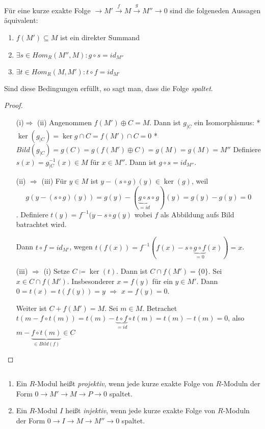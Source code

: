 \documentclass[../main.tex]{subfiles}
\begin{document}
\begin{theorem}%
    Für eine kurze exakte Folge $\rightarrow M'\overset{f}{\rightarrow} M \overset{g}{\rightarrow} M'' \rightarrow 0$ sind die folgeneden Aussagen äquivalent:
    \begin{enumerate}[label=(\roman*)]
        \item $f(M')\subseteq M$ ist ein direkter Summand
        \item $\exists s\in Hom_R(M'',M): g\circ s = id_{M''}$
        \item $\exists t\in Hom_R(M,M'): t\circ f = id_{M'}$
    \end{enumerate}
    Sind diese Bedingungen erfüllt, so sagt man, dass die Folge \emph{spaltet}.
\end{theorem}
\begin{proof}$ $
    \begin{itemize}
        \item[(i)$\Rightarrow$ (ii)]
        Angenommen $f(M')\oplus C = M$.
        Dann ist $g_{|C}$ ein Isomorphismus:
        * $\ker(g_{|C}) = \ker{g}\cap C = f(M')\cap C = 0$
        * $Bild(g_{|C}) = g(C) = g(f(M')\oplus C) = g(M) = g(M) = M''$
        Definiere $s(x) = g_{|C}^{-1}(x)\in M$ für $x\in M''$.
        Dann ist $g\circ s = id_{M''}$.
        \item[(ii) $\Rightarrow$ (iii)]
        Für $y\in M$ ist $y-(s\circ g) (y) \in \ker(g)$, weil $$g(y-(s\circ g) (y)) = g(y)- (\underbrace{g\circ s}_{= id}\circ g) (y) = g(y) - g(y) = 0$$.
        Definiere $t(y) = f^{-1}(y- s\circ g (y)$ wobei $f$ als Abbildung aufs Bild batrachtet wird.
        
        Dann $t\circ f = id_{M'}$, wegen
        $t(f(x)) = f^{-1}(f(x) - s\circ \underbrace{g \circ f}_{ = 0} (x)) = x$.
        \item[(iii) $\Rightarrow$ (i)]
        Setze $C\coloneqq \ker(t)$.
        Dann ist $C\cap f(M') = \{0\}$. Sei $x\in C\cap f(M')$. Insbesonderer $x=f(y)$ für ein $y\in M'$. Dann $0 = t(x) = t(f(y)) = y$ $\Longrightarrow$ $x = f(y) = 0$.

        Weiter ist $C+f(M') = M$. Sei $m\in M$.
        Betrachet $t(m-f\circ t(m)) = t(m) - \underbrace{t\circ f}_{=id} \circ t(m) = t(m)-t(m) = 0$, also $m-\underbrace{f\circ t(m)}_{\in Bild(f)} \in C$
    \end{itemize}
\end{proof}
\begin{definition}$ $
    \begin{enumerate}[label=\alph*)]
        \item 
        Ein $R$-Modul heißt \emph{projektiv}, wenn jede kurze exakte Folge von $R$-Moduln der Form $0\rightarrow M' \rightarrow M \rightarrow P\rightarrow 0$ spaltet.
        \item 
        Ein $R$-Modul $I$ heißt \emph{injektiv}, wenn jede kurze exakte Folge von $R$-Moduln der Form $0\rightarrow I\rightarrow M \rightarrow M'' \rightarrow 0$ spaltet.
    \end{enumerate}
\end{definition}
\end{document}
